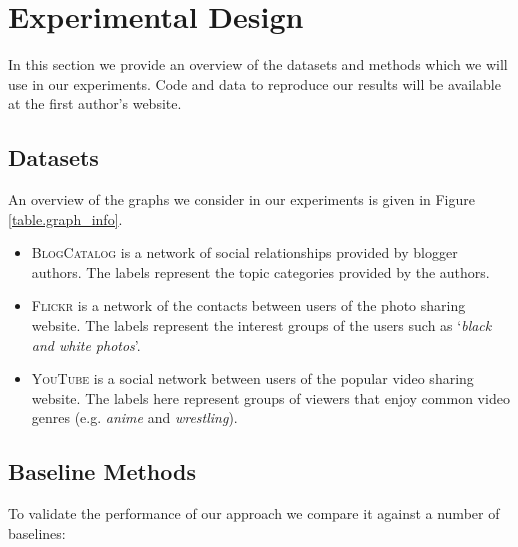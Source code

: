 \documentclass{sig-alternate}
\newcommand{\blogcatalog}{\textsc{BlogCatalog}}
\newcommand{\flickr}{\textsc{Flickr}}
\newcommand{\cora}{\textsc{Cora}}
\newcommand{\citeseer}{\textsc{Citeseer}}
\newcommand{\youtube}{\textsc{YouTube}}
\begin{document}


\section{Experimental Design}
\label{sec:experimental_design}

In this section we provide an overview of the datasets and methods which we will use in our experiments.  Code and data to reproduce our results will be available at the first author's website.

\subsection{Datasets}

An overview of the graphs we consider in our experiments is given in Figure \ref{table.graph_info}.

\begin{itemize}[itemsep=1pt, topsep=5pt, partopsep=0pt]
\item \blogcatalog \cite{Tang:2009:RLV:1557019.1557109} is a network of social relationships provided by blogger authors.  The labels represent the topic categories provided by the authors.
\item \flickr \cite{Tang:2009:RLV:1557019.1557109} is a network of the contacts between users of the photo sharing website.  The labels represent the interest groups of the users such as `\emph{black and white photos}'.
\item \youtube \cite{tang2009scalable} is a social network between users of the popular video sharing website.  The labels here represent groups of viewers that enjoy common video genres (e.g. \emph{anime} and \emph{wrestling}).
\end{itemize}

\subsection{Baseline Methods}
To validate the performance of our approach we compare it against a number of baselines:
\end{document}
